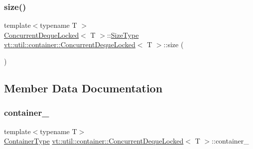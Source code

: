 \mbox{\label{structvt_1_1util_1_1container_1_1_concurrent_deque_locked_abf19557ef8b6483fd821f7c7fd184153}} 
\subsubsection{\texorpdfstring{size()}{size()}}
{\footnotesize\ttfamily template$<$typename T $>$ \\
\hyperlink{structvt_1_1util_1_1container_1_1_concurrent_deque_locked}{Concurrent\+Deque\+Locked}$<$ T $>$\+::\hyperlink{structvt_1_1util_1_1container_1_1_concurrent_deque_locked_a6f35f4923f1329d25378656b0582e916}{Size\+Type} \hyperlink{structvt_1_1util_1_1container_1_1_concurrent_deque_locked}{vt\+::util\+::container\+::\+Concurrent\+Deque\+Locked}$<$ T $>$\+::size (\begin{DoxyParamCaption}{ }\end{DoxyParamCaption})}



\subsection{Member Data Documentation}
\mbox{\label{structvt_1_1util_1_1container_1_1_concurrent_deque_locked_a5055eeb8cdb93e4e9fb84deb237998f2}} 
\subsubsection{\texorpdfstring{container\+\_\+}{container\_}}
{\footnotesize\ttfamily template$<$typename T$>$ \\
\hyperlink{structvt_1_1util_1_1container_1_1_concurrent_deque_locked_ab8d922cda54539b322830391268284bb}{Container\+Type} \hyperlink{structvt_1_1util_1_1container_1_1_concurrent_deque_locked}{vt\+::util\+::container\+::\+Concurrent\+Deque\+Locked}$<$ T $>$\+::container\+\_\+\hspace{0.3cm}{\ttfamily [private]}}


